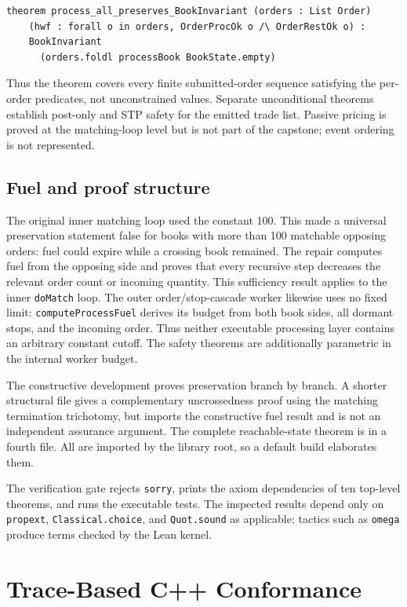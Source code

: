 \documentclass[runningheads]{llncs}
\begin{document}
\begin{lstlisting}
theorem process_all_preserves_BookInvariant (orders : List Order)
    (hwf : forall o in orders, OrderProcOk o /\ OrderRestOk o) :
    BookInvariant
      (orders.foldl processBook BookState.empty)
\end{lstlisting}

Thus the theorem covers every finite submitted-order sequence satisfying the
per-order predicates, not unconstrained values. Separate unconditional
theorems establish post-only and STP safety for the emitted trade list. Passive
pricing is proved at the matching-loop level but is not part of the capstone;
event ordering is not represented.

\subsection{Fuel and proof structure}

The original inner matching loop used the constant 100. This made a universal
preservation statement false for books with more than 100 matchable opposing
orders: fuel could expire while a crossing book remained. The repair computes
fuel from the opposing side and proves that every recursive step decreases the
relevant order count or incoming quantity. This sufficiency result applies to
the inner \texttt{doMatch} loop. The outer order/stop-cascade worker likewise
uses no fixed limit: \texttt{computeProcessFuel} derives its budget from both
book sides, all dormant stops, and the incoming order. Thus neither executable
processing layer contains an arbitrary constant cutoff. The safety theorems
are additionally parametric in the internal worker budget.

The constructive development proves preservation branch by branch. A shorter
structural file gives a complementary uncrossedness proof using the matching
termination trichotomy, but imports the constructive fuel result and is not an
independent assurance argument. The complete reachable-state theorem is in a
fourth file. All are imported by the library root, so a default build
elaborates them.

The verification gate rejects \texttt{sorry}, prints the axiom dependencies of
ten top-level theorems, and runs the executable tests. The inspected results
depend only on \texttt{propext}, \texttt{Classical.choice}, and
\texttt{Quot.sound} as applicable; tactics such as \texttt{omega} produce
terms checked by the Lean kernel.

\section{Trace-Based C++ Conformance}
\end{document}

